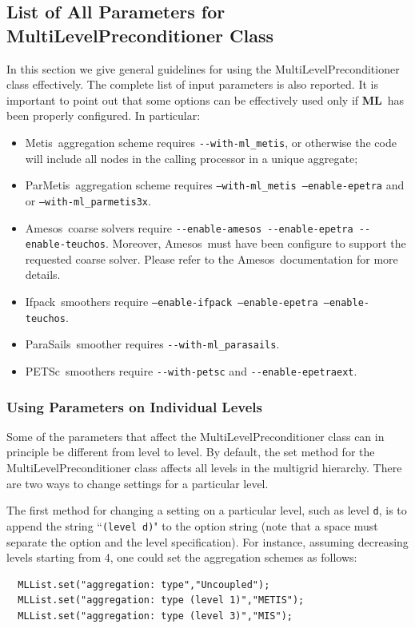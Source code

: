 \documentclass{article}[11pt]
\newcommand{\ML}     {{\bf ML}}
\newcommand{\amesos}  {{\sc Amesos}}
\newcommand{\metis}  {{\sc Metis}}
\newcommand{\parmetis}  {{\sc ParMetis}}
\newcommand{\ifpack}  {{\sc Ifpack}}
\newcommand{\parasails}  {{\sc ParaSails}}
\newcommand \petsc {PETSc}
\begin{document}
\subsection{List of All Parameters for MultiLevelPreconditioner Class}
\label{all possible parameters}
%
In this section we give general guidelines for using the
MultiLevelPreconditioner class effectively.
The complete list of input parameters is also reported.
%
It is important to point out that some options can be effectively used
only if \ML\ has been properly configured. In particular:
\begin{itemize}
\item \metis\ aggregation scheme requires \verb!--with-ml_metis!, or
  otherwise the code will include all nodes in the calling processor in
  a unique aggregate;
\item \parmetis~aggregation scheme requires {\tt --with-ml\_metis
  --enable-epetra} and  or
  {\tt --with-ml\_parmetis3x}. 
\item \amesos~coarse solvers require \verb!--enable-amesos --enable-epetra --enable-teuchos!. Moreover,
  \amesos~must have been configure to support the requested coarse
  solver. Please refer to the \amesos~documentation for more details.
\item \ifpack~smoothers require {\tt --enable-ifpack --enable-epetra
  --enable-teuchos}.
\item \parasails~smoother requires \verb!--with-ml_parasails!.
\item \petsc~smoothers require \verb!--with-petsc! and
\verb!--enable-epetraext!.
\end{itemize}




\subsubsection{Using Parameters on Individual Levels}
\label{sec:parameters on different levels}
%
Some of the parameters that affect the MultiLevelPreconditioner class can in
principle be different from level to level.  By default, the set method
for the MultiLevelPreconditioner class affects all levels in the
multigrid hierarchy.  There are two ways to change settings for a particular
level.

The first method for changing a setting on a particular level,
such as level \verb!d!, is to append the string ``\verb!(level d)!" to the
option string (note that a space must separate the option and the level
specification).  For instance, assuming decreasing levels starting from
4, one could set the aggregation schemes as follows:
\begin{verbatim}
  MLList.set("aggregation: type","Uncoupled");
  MLList.set("aggregation: type (level 1)","METIS");
  MLList.set("aggregation: type (level 3)","MIS");
\end{verbatim}
\end{document}
